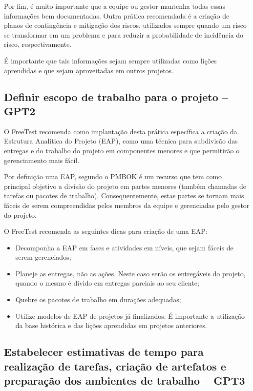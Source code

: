 Por fim, é muito importante que a equipe ou gestor mantenha todas essas informações bem documentadas. Outra prática recomendada é a criação de planos de contingência e mitigação dos riscos, utilizados sempre quando um risco se transformar em um problema e para reduzir a probabilidade de incidência do risco, respectivamente.

É importante que tais informações sejam sempre utilizadas como lições aprendidas e que sejam aproveitadas em outros projetos.

\subsection{Definir escopo de trabalho para o projeto – GPT2}
\label{sec:guiagpt2}

O FreeTest recomenda como implantação desta prática específica a criação da Estrutura Analítica do Projeto (EAP), como uma técnica para subdivisão das entregas e do trabalho do projeto em componentes menores e que permitirão o gerenciamento mais fácil.

Por definição uma EAP, segundo o PMBOK \cite{pmbok2014} é um recurso que tem como principal objetivo a divisão do projeto em partes menores (também chamadas de tarefas ou pacotes de trabalho). Consequentemente, estas partes se tornam mais fáceis de serem compreendidas pelos membros da equipe e gerenciadas pelo gestor do projeto.

O FreeTest recomenda as seguintes dicas para criação de uma EAP:

\begin{itemize}
	\item Decomponha a EAP em fases e atividades em níveis, que sejam fáceis de serem gerenciados;
	\item Planeje as entregas, não as ações. Neste caso serão os entregáveis do projeto, quando o mesmo é divido em entregas parciais ao seu cliente;
	\item Quebre os pacotes de trabalho em durações adequadas;
	\item Utilize modelos de EAP de projetos já finalizados. É importante a utilização da base histórica e das lições aprendidas em projetos anteriores.
\end{itemize}

\subsection{Estabelecer estimativas de tempo para realização de tarefas, criação de artefatos e preparação dos ambientes de trabalho – GPT3}
\label{sec:guiagpt3}

